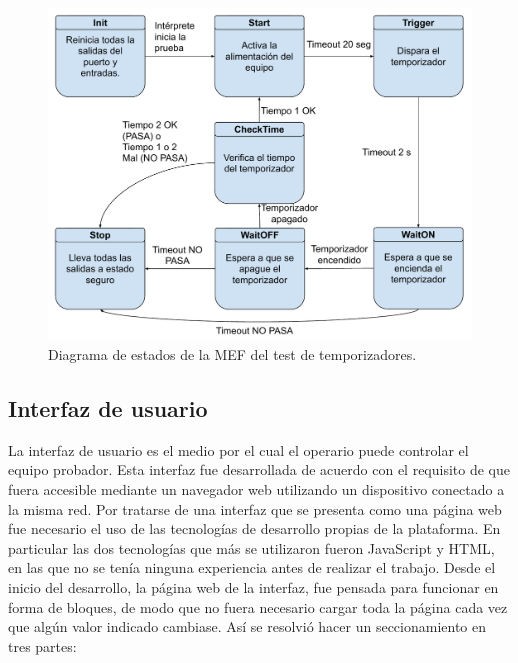 \begin{figure}[H]
	\centering
	\includegraphics[width=1\textwidth]{./Figures/FSMTestTemp.pdf}
	\caption{Diagrama de estados de la MEF del test de temporizadores.}
	\label{fig:FSMTestTemp}
\end{figure}

\subsection{Interfaz de usuario}

La interfaz de usuario es el medio por el cual el operario puede controlar el equipo probador.
Esta interfaz fue desarrollada de acuerdo con el requisito de que fuera accesible mediante un navegador web utilizando un dispositivo conectado a la misma red.
Por tratarse de una interfaz que se presenta como una página web fue necesario el uso de las tecnologías de desarrollo propias de la plataforma. En particular las dos tecnologías que más se utilizaron fueron JavaScript y HTML, en las que no se tenía ninguna experiencia antes de realizar el trabajo.
Desde el inicio del desarrollo, la página web de la interfaz, fue pensada para funcionar en forma de bloques, de modo que no fuera necesario cargar toda la página cada vez que algún valor indicado cambiase. Así se resolvió hacer un seccionamiento en tres partes:

